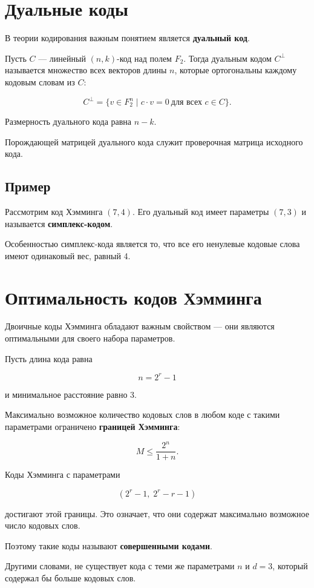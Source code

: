\documentclass[a4paper,12pt]{article}
\begin{document}
\section{Дуальные коды}

В теории кодирования важным понятием является \textbf{дуальный код}.

Пусть $C$ — линейный $(n,k)$-код над полем $F_2$.
Тогда дуальным кодом $C^\perp$ называется множество всех
векторов длины $n$, которые ортогональны каждому
кодовым словам из $C$:

\[
C^\perp = \{ v \in F_2^n \mid c \cdot v = 0 \ \text{для всех } c \in C \}.
\]

Размерность дуального кода равна $n-k$.

Порождающей матрицей дуального кода служит
проверочная матрица исходного кода.

\subsection{Пример}

Рассмотрим код Хэмминга $(7,4)$.
Его дуальный код имеет параметры $(7,3)$
и называется \textbf{симплекс-кодом}.

Особенностью симплекс-кода является то,
что все его ненулевые кодовые слова
имеют одинаковый вес, равный 4.

\section{Оптимальность кодов Хэмминга}

Двоичные коды Хэмминга обладают важным свойством —
они являются оптимальными для своего набора параметров.

Пусть длина кода равна

\[
n = 2^r - 1
\]

и минимальное расстояние равно $3$.

Максимально возможное количество кодовых слов
в любом коде с такими параметрами ограничено
\textbf{границей Хэмминга}:

\[
M \le \frac{2^n}{1+n}.
\]

Коды Хэмминга с параметрами

\[
(2^r - 1,\; 2^r - r - 1)
\]

достигают этой границы. Это означает,
что они содержат максимально возможное
число кодовых слов.

Поэтому такие коды называют
\textbf{совершенными кодами}.

Другими словами, не существует кода
с теми же параметрами $n$ и $d=3$,
который содержал бы больше кодовых слов.
\end{document}
